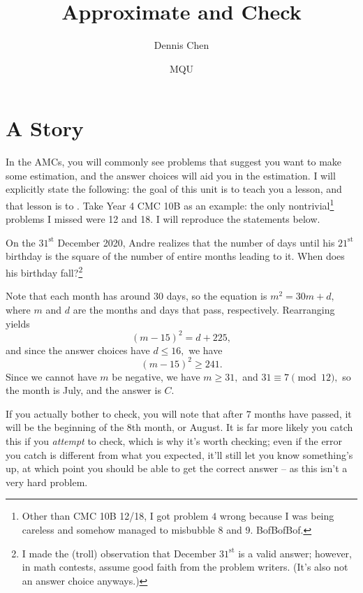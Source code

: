\documentclass[mast]{lucky}
\title{Approximate and Check}
\author{Dennis Chen}
\date{MQU}
\begin{document}
\maketitle

\section{A Story}

 In the AMCs, you will commonly see problems that suggest you want to make some estimation, and the answer choices will aid you in the estimation. I will explicitly state the following: the goal of this unit is to teach you a lesson, and that lesson is to . Take Year 4 CMC 10B as an example: the only nontrivial\footnote{Other than CMC 10B 12/18, I got problem $4$ wrong because I was being careless and somehow managed to misbubble 8 and 9. BofBofBof.} problems I missed were 12 and 18. I will reproduce the statements below.

\begin{exam}[CMC 10B 2021/12]
On the $31^{\text{st}}$ December 2020, Andre realizes that the number of days until his $21^{\text{st}}$ birthday is the square of the number of entire months leading to it. When does his birthday fall?\footnote{I made the (troll) observation that December $31^{\text{st}}$ is a valid answer; however, in math contests, assume good faith from the problem writers. (It's also not an answer choice anyways.)}

\end{exam}

\begin{sol}[(Bogus)]
Note that each month has around $30$ days, so the equation is $m^2=30m+d,$ where $m$ and $d$ are the months and days that pass, respectively. Rearranging yields
\[(m-15)^2=d+225,\]
and since the answer choices have $d\leq 16,$ we have
\[(m-15)^2\geq 241.\]
Since we cannot have $m$ be negative, we have $m\geq 31,$ and $31\equiv 7\pmod{12},$ so the month is July, and the answer is $C.$
\end{sol}

If you actually bother to check, you will note that after $7$  months have passed, it will be the beginning of the $8$th month, or August. It is far more likely you catch this if you \textit{attempt} to check, which is why it's worth checking; even if the error you catch is different from what you expected, it'll still let you know something's up, at which point you should be able to get the correct answer -- as this isn't a very hard problem.
\end{document}
